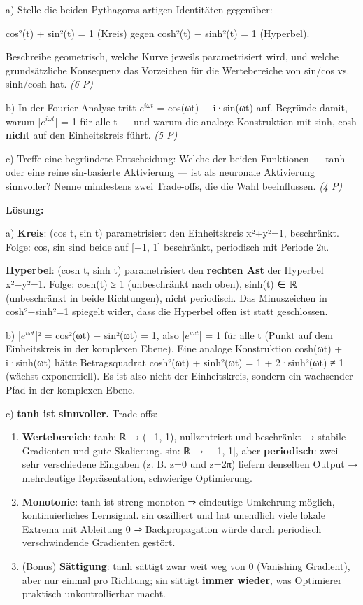 \documentclass[11pt, a4paper]{article}
\begin{document}
a) Stelle die beiden Pythagoras-artigen Identitäten gegenüber:

cos²(t) + sin²(t) = 1 (Kreis) gegen cosh²(t) − sinh²(t) = 1 (Hyperbel).

Beschreibe geometrisch, welche Kurve jeweils parametrisiert wird, und welche grundsätzliche Konsequenz das Vorzeichen für die Wertebereiche von sin/cos vs. sinh/cosh hat. \textit{(6 P)}


b) In der Fourier-Analyse tritt $e^{iωt}$ = cos(ωt) + i·sin(ωt) auf. Begründe damit, warum |$e^{iωt}$| = 1 für alle t — und warum die analoge Konstruktion mit sinh, cosh \textbf{nicht} auf den Einheitskreis führt. \textit{(5 P)}


c) Treffe eine begründete Entscheidung: Welche der beiden Funktionen — tanh oder eine reine sin-basierte Aktivierung — ist als neuronale Aktivierung sinnvoller? Nenne mindestens zwei Trade-offs, die die Wahl beeinflussen. \textit{(4 P)}


\textbf{Lösung:}


a) \textbf{Kreis}: (cos t, sin t) parametrisiert den Einheitskreis x²+y²=1, beschränkt. Folge: cos, sin sind beide auf [−1, 1] beschränkt, periodisch mit Periode 2π.

\textbf{Hyperbel}: (cosh t, sinh t) parametrisiert den \textbf{rechten Ast} der Hyperbel x²−y²=1. Folge: cosh(t) ≥ 1 (unbeschränkt nach oben), sinh(t) ∈ ℝ (unbeschränkt in beide Richtungen), nicht periodisch. Das Minuszeichen in cosh²−sinh²=1 spiegelt wider, dass die Hyperbel offen ist statt geschlossen.


b) |$e^{iωt}$|² = cos²(ωt) + sin²(ωt) = 1, also |$e^{iωt}$| = 1 für alle t (Punkt auf dem Einheitskreis in der komplexen Ebene). Eine analoge Konstruktion cosh(ωt) + i·sinh(ωt) hätte Betragsquadrat cosh²(ωt) + sinh²(ωt) = 1 + 2·sinh²(ωt) ≠ 1 (wächst exponentiell). Es ist also nicht der Einheitskreis, sondern ein wachsender Pfad in der komplexen Ebene.


c) \textbf{tanh ist sinnvoller.} Trade-offs:

\begin{enumerate}
  \item \textbf{Wertebereich}: tanh: ℝ → (−1, 1), nullzentriert und beschränkt → stabile Gradienten und gute Skalierung. sin: ℝ → [−1, 1], aber \textbf{periodisch}: zwei sehr verschiedene Eingaben (z. B. z=0 und z=2π) liefern denselben Output → mehrdeutige Repräsentation, schwierige Optimierung.
  \item \textbf{Monotonie}: tanh ist streng monoton ⇒ eindeutige Umkehrung möglich, kontinuierliches Lernsignal. sin oszilliert und hat unendlich viele lokale Extrema mit Ableitung 0 ⇒ Backpropagation würde durch periodisch verschwindende Gradienten gestört.
  \item (Bonus) \textbf{Sättigung}: tanh sättigt zwar weit weg von 0 (Vanishing Gradient), aber nur einmal pro Richtung; sin sättigt \textbf{immer wieder}, was Optimierer praktisch unkontrollierbar macht.
\end{enumerate}




\end{document}
